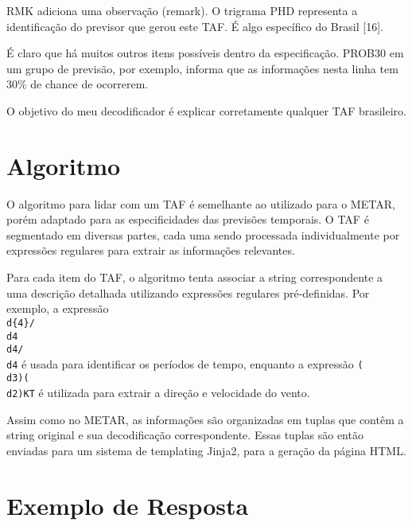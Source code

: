 RMK adiciona uma observação (remark). O trigrama PHD representa a identificação 
do previsor que
gerou este TAF. É algo específico do Brasil [16].

É claro que há muitos outros itens possíveis dentro da especificação. PROB30 em 
um grupo de previsão, por exemplo, informa que as informações nesta linha tem 
30\% de chance de ocorrerem.

O objetivo do meu decodificador é explicar corretamente qualquer TAF brasileiro.


\section{Algoritmo}

O algoritmo para lidar com um TAF é semelhante ao utilizado para o METAR, porém adaptado
para as especificidades das previsões temporais. O TAF é segmentado em diversas
partes, cada uma sendo processada individualmente por expressões regulares para extrair as
informações relevantes.

Para cada item do TAF, o algoritmo tenta associar a string correspondente a uma descrição
detalhada utilizando expressões regulares pré-definidas. Por exemplo, a expressão
\texttt{\\d\{4\}/\\d4\\d4/\\d4} é usada para identificar os períodos de tempo, enquanto a expressão
\texttt{(\\d{3})(\\d{2})KT} é utilizada para extrair a direção e velocidade do vento.

Assim como no METAR, as informações são organizadas em tuplas que contêm a string original
e sua decodificação correspondente. Essas tuplas são então enviadas para um sistema de
templating Jinja2, para a geração da página HTML.

\section{Exemplo de Resposta}

